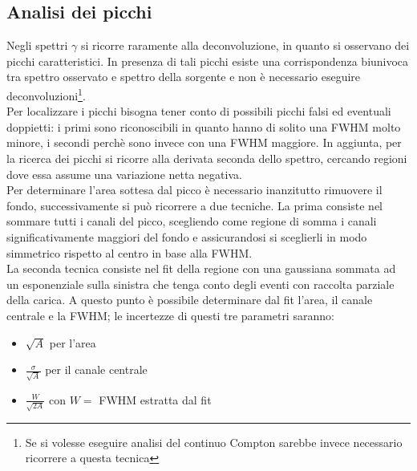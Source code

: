 \subsection{Analisi dei picchi}
Negli spettri $\gamma$ si ricorre raramente alla deconvoluzione, in quanto si osservano dei picchi caratteristici.
In presenza di tali picchi esiste una corrispondenza biunivoca tra spettro osservato e spettro della sorgente e non \`e necessario eseguire
deconvoluzioni\footnote{Se si volesse eseguire analisi del continuo Compton sarebbe invece necessario ricorrere a questa tecnica}.\\
Per localizzare i picchi bisogna tener conto di possibili picchi falsi ed eventuali doppietti: i primi sono riconoscibili in quanto hanno di solito
una FWHM molto minore, i secondi perch\`e sono invece con una FWHM maggiore.
In aggiunta, per la ricerca dei picchi si ricorre alla derivata seconda dello spettro, cercando regioni dove essa assume una variazione netta negativa.\\
Per determinare l'area sottesa dal picco \`e necessario inanzitutto rimuovere il fondo, successivamente si pu\`o ricorrere a due tecniche.
La prima consiste nel sommare tutti i canali del picco, scegliendo come regione di somma i canali significativamente maggiori del fondo e
assicurandosi si sceglierli in modo simmetrico rispetto al centro in base alla FWHM.\\
La seconda tecnica consiste nel fit della regione con una gaussiana sommata ad un esponenziale sulla sinistra che tenga conto degli eventi
con raccolta parziale della carica.
A questo punto \`e possibile determinare dal fit l'area, il canale centrale e la FWHM; le incertezze di questi tre parametri saranno:
\begin{itemize}
\item $\sqrt{A}$ per l'area
\item $\frac{\sigma}{\sqrt{A}}$ per il canale centrale
\item $\frac{W}{\sqrt{2A}}$ con $W=$ FWHM estratta dal fit
\end{itemize}
